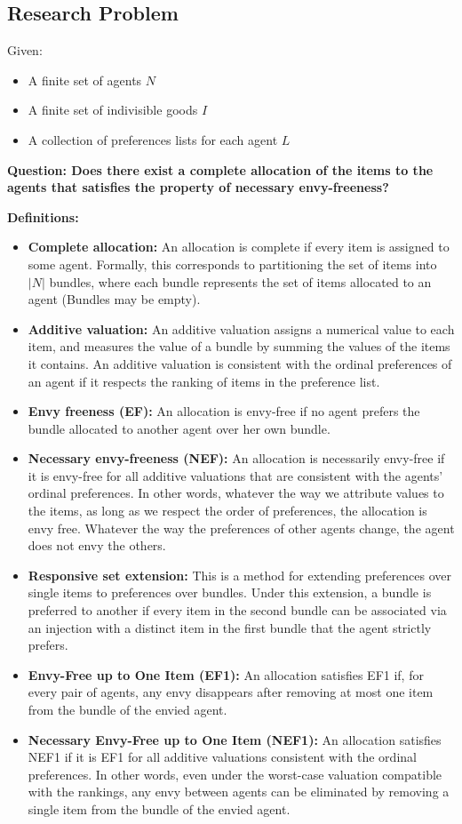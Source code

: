 \documentclass[12pt,a4paper]{article}
\begin{document}
\subsection*{Research Problem}
Given:
\begin{itemize}
    \item A finite set of agents $N$
    \item A finite set of indivisible goods $I$
    \item A collection of preferences lists for each agent $L$
\end{itemize}
\textbf{Question: Does there exist a complete allocation of the items to the agents that satisfies the property of necessary envy-freeness?}

\textbf{Definitions:}
\begin{itemize}
    \item \textbf{Complete allocation:} 
An allocation is complete if every item is assigned to some agent.  
Formally, this corresponds to partitioning the set of items into $|N|$ bundles, where each bundle represents the set of items allocated to an agent (Bundles may be empty).
    \item \textbf{Additive valuation:} 
An additive valuation assigns a numerical value to each item, and measures the value of a bundle by summing the values of the items it contains.  
An additive valuation is consistent with the ordinal preferences of an agent if it respects the ranking of items in the preference list.
    \item \textbf{Envy freeness (EF):} 
An allocation is envy-free if no agent prefers the bundle allocated to another agent over her own bundle.
    \item \textbf{Necessary envy-freeness (NEF):} 
An allocation is necessarily envy-free if it is envy-free for all additive valuations that are consistent with the agents' ordinal preferences. 
In other words, whatever the way we attribute values to the items, as long as we respect the order of preferences, the allocation is envy free. Whatever the way the preferences of other agents change, the agent does not envy the others.
    \item \textbf{Responsive set extension:} 
This is a method for extending preferences over single items to preferences over bundles. 
Under this extension, a bundle is preferred to another if every item in the second bundle can be associated via an injection with a distinct item in the first bundle that the agent strictly prefers.
    \item \textbf{Envy-Free up to One Item (EF1):}
An allocation satisfies EF1 if, for every pair of agents, any envy disappears after removing at most one item from the bundle of the envied agent.
    \item \textbf{Necessary Envy-Free up to One Item (NEF1):}
An allocation satisfies NEF1 if it is EF1 for all additive valuations consistent with the ordinal preferences.  
In other words, even under the worst-case valuation compatible with the rankings, any envy between agents can be eliminated by removing a single item from the bundle of the envied agent.
\end{itemize}
\end{document}
